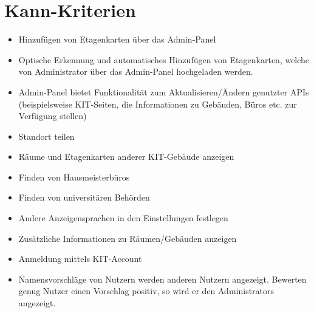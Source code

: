 \section{Kann-Kriterien}

\begin{itemize}

    \item Hinzufügen von Etagenkarten über das \Gls{Admin-Panel}
    \item Optische Erkennung und automatisches Hinzufügen von Etagenkarten,
          welche von \Gls{Administrator} über das \Gls{Admin-Panel} hochgeladen werden.
    \item \Gls{Admin-Panel} bietet Funktionalität zum Aktualisieren/Ändern genutzter \Gls{API}s (beispielsweise \Gls{KIT}-Seiten, die Informationen zu Gebäuden, Büros etc. zur Verfügung stellen)
    \item Standort teilen 
    \item Räume und Etagenkarten anderer \Gls{KIT}-Gebäude anzeigen
    \item Finden von Hausmeisterbüros
    \item Finden von universitären Behörden
    \item Andere Anzeigensprachen in den Einstellungen festlegen
    \item Zusätzliche Informationen zu Räumen/Gebäuden anzeigen
    \item Anmeldung mittels \Gls{KIT}-Account
    \item Namensvorschläge von Nutzern werden anderen Nutzern angezeigt. Bewerten genug Nutzer einen 
    Vorschlag positiv, so wird er den \Glspl{Administrator} angezeigt.
    
        

\end{itemize}
